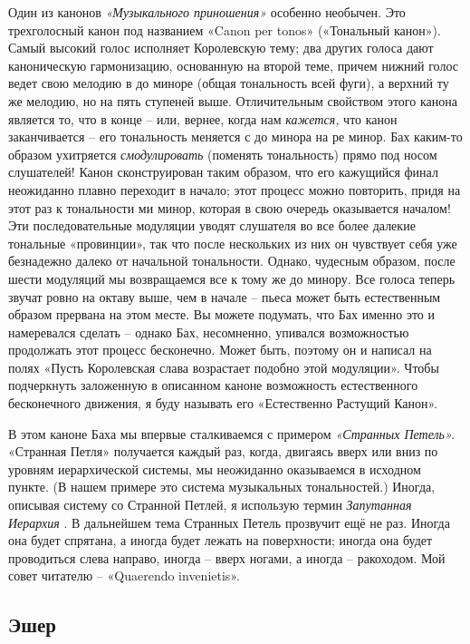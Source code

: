 \documentclass[../main.tex]{subfiles}
\begin{document}
Один из канонов \emph{«Музыкального приношения»} особенно необычен. Это трехголосный канон под названием «Canon per tonos» («Тональный канон»). Самый высокий голос исполняет Королевскую тему; два других голоса дают каноническую гармонизацию, основанную на второй теме, причем нижний голос ведет свою мелодию в до миноре (общая тональность всей фуги), а верхний  ту же мелодию, но на пять ступеней выше. Отличительным свойством этого канона является то, что в конце \--- или, вернее, когда нам \emph{кажется,} что канон заканчивается \--- его тональность меняется с до минора на ре минор. Бах каким-то образом ухитряется \emph{смодулировать} (поменять тональность) прямо под носом слушателей! Канон сконструирован таким образом, что его кажущийся финал неожиданно плавно переходит в начало; этот процесс можно повторить, придя на этот раз к тональности ми минор, которая в свою очередь оказывается началом! Эти последовательные модуляции уводят слушателя во все более далекие тональные «провинции», так что после нескольких из них он чувствует себя уже безнадежно далеко от начальной тональности. Однако, чудесным образом, после шести модуляций мы возвращаемся все к тому же до минору. Все голоса теперь звучат ровно на октаву выше, чем в начале \--- пьеса может быть естественным образом прервана на этом месте. Вы можете подумать, что Бах именно это и намеревался сделать \--- однако Бах, несомненно, упивался возможностью продолжать этот процесс бесконечно. Может быть, поэтому он и написал на полях «Пусть Королевская слава возрастает подобно этой модуляции». Чтобы подчеркнуть заложенную в описанном каноне возможность естественного бесконечного движения, я буду называть его «Естественно Растущий Канон».

В этом каноне Баха мы впервые сталкиваемся с примером \emph{«Странных Петель».} «Странная Петля» получается каждый раз, когда, двигаясь вверх или вниз по уровням иерархической системы, мы неожиданно оказываемся в исходном пункте. (В нашем примере это система музыкальных тональностей.) Иногда, описывая систему со Странной Петлей, я использую термин \emph{Запутанная Иерархия} . В дальнейшем тема Странных Петель прозвучит ещё не раз. Иногда она будет спрятана, а иногда будет лежать на поверхности; иногда она будет проводиться слева направо, иногда \--- вверх ногами, а иногда \--- ракоходом. Мой совет читателю \--- «Quaerendo invenietis».


\subsection{Эшер}
\end{document}
